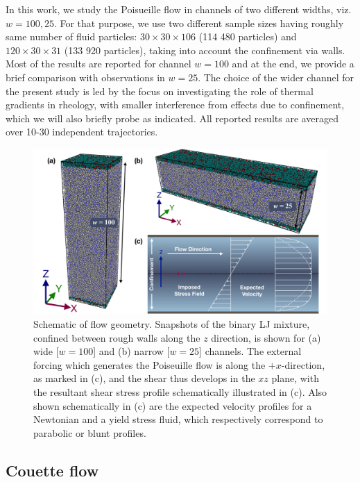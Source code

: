 In this work, we study the Poisueille flow in channels of two different widths, viz. $w=100, 25$. For that purpose, we use two different sample sizes having roughly same number of fluid particles: $30 \times 30 \times 106$ (114 480 particles) and $120 \times 30 \times 31$ (133 920 particles), taking into account the confinement via walls. Most of the results are reported for channel $w=100$ and at the end, we provide a brief comparison with observations in $w=25$. The choice of the wider channel for the present study is led by the focus on investigating the role of thermal gradients in rheology, with smaller interference from effects due to confinement, which we will also briefly probe as indicated. All reported results are averaged over 10-30 independent trajectories.


\begin{figure}
\centering
\includegraphics[width=15cm]{figs/schematicPoiseFlow.pdf}
\caption[{\em Schematic of Poiseuille flow geometry and snapshots of the binary LJ mixture confined between rough walls for two different channel widths}]{Schematic of flow geometry. Snapshots of the binary LJ mixture, confined between rough walls along the $z$ direction, is shown for (a) wide [$w=100$] and (b) narrow [$w=25$] channels. The external forcing which generates the Poiseuille flow is along the $+x$-direction, as marked in (c), and the shear thus develops in the $xz$ plane, with the resultant shear stress profile schematically illustrated in (c). Also shown schematically in (c) are the expected velocity profiles for a Newtonian and a yield stress fluid, which respectively correspond to parabolic or blunt profiles.}
\label{fig0}
\end{figure}

\subsection{Couette flow}

